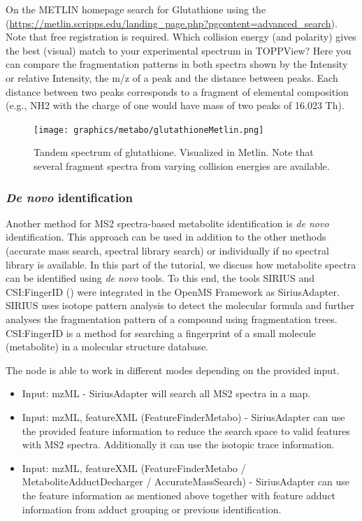 \begin{task}
On the METLIN homepage search for  Glutathione using the  (\url{https://metlin.scripps.edu/landing_page.php?pgcontent=advanced_search}). Note that free registration is required. Which collision energy (and polarity) gives the best (visual) match to your experimental spectrum in TOPPView? Here you can compare the fragmentation patterns in both spectra shown by the Intensity or relative Intensity, the m/z of a peak and the distance between peaks. Each distance between two peaks corresponds to a fragment of elemental composition (e.g., NH2 with the charge of one would have mass of two peaks of 16.023 Th).
\end{task}

\begin{figure}[htbp]
  \centering
  \texttt{[image: graphics/metabo/glutathioneMetlin.png]}
  \caption{Tandem spectrum of glutathione. Visualized in Metlin. Note that several fragment spectra from varying collision energies are available.}
  \label{fig:glutathioneMetlin}
\end{figure}

\subsubsection{\protect\textit{De novo} identification}

Another method for MS2 spectra-based metabolite identification is \textit{de novo} identification. 
This approach can be used in addition to the other methods (accurate mass search, spectral library search) or individually if no spectral library is available. In this part of the tutorial, we discuss how metabolite spectra can be identified using \textit{de novo} tools. To this end, the tools SIRIUS and CSI:FingerID (\cite{Bocker2009,Bocker2016,Duhrkop2015}) were integrated in the OpenMS Framework as SiriusAdapter. SIRIUS uses isotope pattern analysis to detect the molecular formula and further analyses the fragmentation pattern of a compound using fragmentation trees. CSI:FingerID  is a method for searching a fingerprint of a small molecule (metabolite) in a molecular structure database.

The node is able to work in different modes depending on the provided input. 
\begin{itemize}
\item Input: mzML - SiriusAdapter will search all MS2 spectra in a map.  
\item Input: mzML, featureXML (FeatureFinderMetabo) - SiriusAdapter can use the provided feature information to reduce the search space to valid features with MS2 spectra. Additionally it can use the isotopic trace information. 
\item Input: mzML, featureXML (FeatureFinderMetabo / MetaboliteAdductDecharger / AccurateMassSearch) - SiriusAdapter can use the feature information as mentioned above together with feature adduct information from adduct grouping or previous identification.
\end{itemize}


